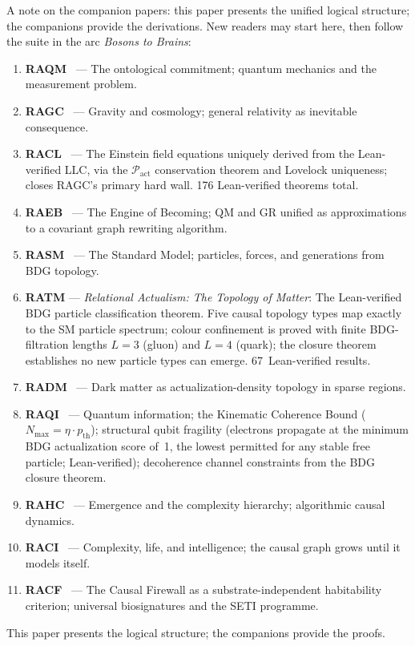 \documentclass[11pt,a4paper]{article}
\begin{document}
A note on the companion papers: this paper presents the unified logical
structure; the companions provide the derivations. New readers may start
here, then follow the suite in the arc \emph{Bosons to Brains}:
\begin{enumerate}[noitemsep,label=\arabic*.,leftmargin=*]
  \item \textbf{RAQM}~\citep{Sandeman2026RAQM} --- The ontological commitment;
  quantum mechanics and the measurement problem.
  \item \textbf{RAGC}~\citep{Sandeman2026RAGC} --- Gravity and cosmology;
  general relativity as inevitable consequence.
  \item \textbf{RACL}~\citep{Sandeman2026RACL} --- The Einstein field
  equations uniquely derived from the Lean-verified LLC, via the
  $\mathcal{P}_{\mathrm{act}}$ conservation theorem and Lovelock uniqueness;
  closes RAGC's primary hard wall. 176 Lean-verified theorems total.
  \item \textbf{RAEB}~\citep{Sandeman2026RAEB} --- The Engine of Becoming;
  QM and GR unified as approximations to a covariant graph rewriting algorithm.
  \item \textbf{RASM}~\citep{Sandeman2026RASM} --- The Standard Model;
  particles, forces, and generations from BDG topology.
  \item \textbf{RATM} --- \emph{Relational Actualism: The Topology of Matter}: The Lean-verified BDG particle classification theorem. Five causal topology types map exactly to the SM particle spectrum; colour confinement is proved with finite BDG-filtration lengths $L=3$ (gluon) and $L=4$ (quark); the closure theorem establishes no new particle types can emerge. 67~Lean-verified results.

\item \textbf{RADM}~\citep{Sandeman2026RADM} --- Dark matter as
  actualization-density topology in sparse regions.
  \item \textbf{RAQI}~\citep{Sandeman2026RAQI} --- Quantum information;
  the Kinematic Coherence Bound ($N_{\max} = \eta \cdot p_{\mathrm{th}}$);
  structural qubit fragility (electrons propagate at the minimum BDG
  actualization score of~1, the lowest permitted for any stable free particle;
  Lean-verified); decoherence channel constraints from the BDG closure theorem.
  \item \textbf{RAHC}~\citep{Sandeman2026RAHC} --- Emergence and the
  complexity hierarchy; algorithmic causal dynamics.
  \item \textbf{RACI}~\citep{Sandeman2026RACI} --- Complexity, life,
  and intelligence; the causal graph grows until it models itself.
  \item \textbf{RACF}~\citep{Sandeman2026RACF} --- The Causal Firewall
  as a substrate-independent habitability criterion; universal
  biosignatures and the SETI programme.
\end{enumerate}
This paper presents the logical structure; the companions provide the proofs.
\end{document}
